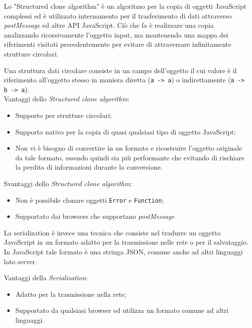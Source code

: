 Lo "Structured clone algorithm" è un algoritmo per la copia di oggetti JavaScript complessi ed è utilizzato internamento per il trasferimento di dati attraverso \textit{postMessage} ed altre API JavaScript. Ciò che fa è realizzare una copia analizzando ricorsivamente l'oggetto input, ma mantenendo una mappa dei riferimenti visitati precedentemente per evitare di attraversare infinitamente strutture circolari. 

Una struttura dati circolare consiste in un campo dell'oggetto il cui valore è il riferimento all'oggetto stesso in maniera diretta (\texttt{a -> a}) o indirettamente (\texttt{a -> b -> a}). \\

Vantaggi dello \textit{Structured clone algorithm}:

\begin{itemize}
    \item Supporto per strutture circolari;
    \item Supporto nativo per la copia di quasi qualsiasi tipo di oggetto JavaScript;
    \item Non vi è bisogno di convertire in un formato e ricostruire l'oggetto originale da tale formato, essendo quindi sia più performante che evitando di rischiare la perdita di informazioni durante la conversione.
\end{itemize}

Svantaggi dello \textit{Structured clone algorithm}:

\begin{itemize}
    \item Non è possibile clonare oggetti \texttt{Error} e \texttt{Function};
    \item Supportato dai browsers che supportano \textit{postMessage}
\end{itemize}

La serialization è invece una tecnica che consiste nel tradurre un oggetto JavaScript in un formato adatto per la trasmissione nelle rete o per il salvataggio. In JavaScript tale formato è una stringa JSON, comune anche ad altri linguaggi lato server.

Vantaggi della \textit{Serialization}:

\begin{itemize}
    \item Adatto per la trasmissione nella rete;
    \item Supportato da qualsiasi browser ed utilizza un formato comune ad altri linguaggi.
\end{itemize}

